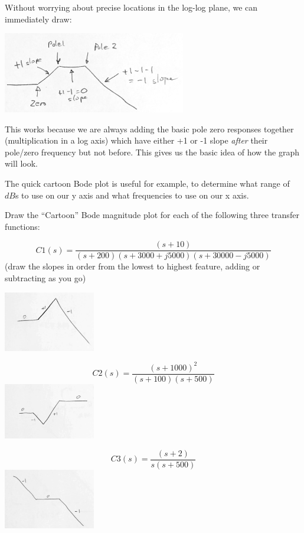 Without worrying about precise locations in the log-log plane, we can immediately
draw:

\includegraphics[width=80mm]{figs05/Q47M85.png}

This works because we are always adding the basic pole zero responses together (multiplication
 in a log axis) which have either
+1 or -1 slope {\it after} their pole/zero frequency but not before.
This gives us the basic idea of how the graph will look.

The quick cartoon Bode plot is useful for example, to
determine what range of $dB$s to use on our y axis and what frequencies to use on our x axis.

\begin{Example}
Draw the ``Cartoon'' Bode magnitude plot for each of the following three transfer functions:

\begin{center}
\[
C1(s) = \frac {(s+10)}  {(s+200)(s+3000+j5000)(s+30000-j5000)}
\]
(draw the slopes in order from the lowest to highest feature, adding or subtracting as you go)

\includegraphics[width=0.3\textwidth]{figs05/J14R56.png}


\[
C2(s) = \frac {(s+1000)^2}  {(s+100)(s+500)}
\]
\includegraphics[width=0.3\textwidth]{figs05/J14R57.png}


\[
C3(s) = \frac {(s+2)}  {s(s+500)}
\]
\includegraphics[width=0.3\textwidth]{figs05/J14R58.png}
\end{center}


\end{Example}



